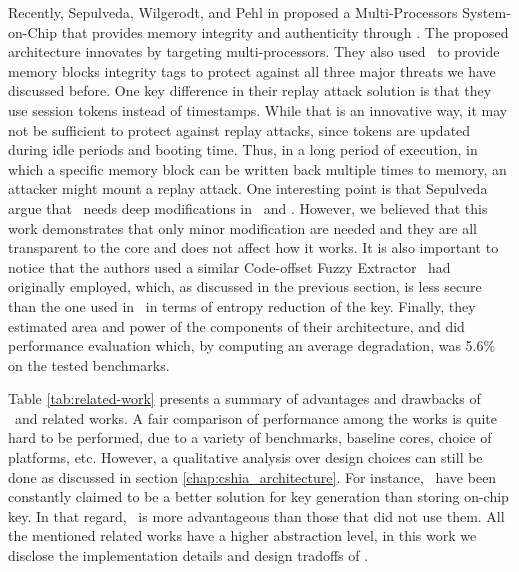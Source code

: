 Recently, Sepulveda, Wilgerodt, and Pehl in \cite{Sepulveda2018:CSHIA} proposed a Multi-Processors System-on-Chip that provides memory integrity and authenticity through \pufs. The proposed architecture innovates by targeting multi-processors. They also used \siphash~to provide memory blocks integrity tags to protect against all three major threats we have discussed before. One key difference in their replay attack solution is that they use session tokens instead of timestamps. While that is an innovative way, it may not be sufficient to protect against replay attacks, since tokens are updated during idle periods and booting time. Thus, in a long period of execution, in which a specific memory block can be written back multiple times to memory, an attacker might mount a replay attack. One interesting point is that Sepulveda \etal argue that \cshia~needs deep modifications in \soc~and \cpu. However, we believed that this work demonstrates that only minor modification are needed and they are all transparent to the core and does not affect how it works. It is also important to notice that the authors used a similar Code-offset Fuzzy Extractor \cshia~had originally employed, which, as discussed in the previous section, is less secure than the one used in \cshia~in terms of entropy reduction of the key. Finally, they estimated area and power of the components of their architecture, and did performance evaluation which, by computing an average degradation, was 5.6\% on the tested benchmarks.

Table \ref{tab:related-work} presents a summary of advantages and drawbacks of \cshia~and related works. A fair comparison of performance among the works is quite hard to be performed, due to a variety of benchmarks, baseline cores, choice of platforms, etc. However, a qualitative analysis over design choices can still be done as discussed in section \ref{chap:cshia_architecture}. For instance, \pufs~have been constantly claimed to be a better solution for key generation than storing on-chip key. In that regard, \cshia~is more advantageous than those that did not use them. All the mentioned related works have a higher abstraction level, in this work we disclose the implementation details  and design tradoffs of \cshia. 




